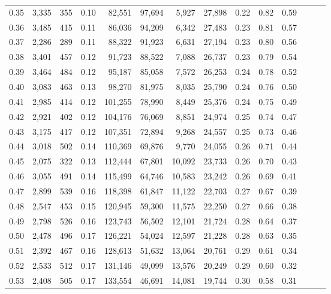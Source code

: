 \begin{tabular}{rrrrrrrrrrrrrr}
0.35 &  3,335 &  355 &  0.10 &   82,551 &   97,694 &   5,927 &  27,898 &  0.22 &  0.82 &      0.59 \\
0.36 &  3,485 &  415 &  0.11 &   86,036 &   94,209 &   6,342 &  27,483 &  0.23 &  0.81 &      0.57 \\
0.37 &  2,286 &  289 &  0.11 &   88,322 &   91,923 &   6,631 &  27,194 &  0.23 &  0.80 &      0.56 \\
0.38 &  3,401 &  457 &  0.12 &   91,723 &   88,522 &   7,088 &  26,737 &  0.23 &  0.79 &      0.54 \\
0.39 &  3,464 &  484 &  0.12 &   95,187 &   85,058 &   7,572 &  26,253 &  0.24 &  0.78 &      0.52 \\
0.40 &  3,083 &  463 &  0.13 &   98,270 &   81,975 &   8,035 &  25,790 &  0.24 &  0.76 &      0.50 \\
0.41 &  2,985 &  414 &  0.12 &  101,255 &   78,990 &   8,449 &  25,376 &  0.24 &  0.75 &      0.49 \\
0.42 &  2,921 &  402 &  0.12 &  104,176 &   76,069 &   8,851 &  24,974 &  0.25 &  0.74 &      0.47 \\
0.43 &  3,175 &  417 &  0.12 &  107,351 &   72,894 &   9,268 &  24,557 &  0.25 &  0.73 &      0.46 \\
0.44 &  3,018 &  502 &  0.14 &  110,369 &   69,876 &   9,770 &  24,055 &  0.26 &  0.71 &      0.44 \\
0.45 &  2,075 &  322 &  0.13 &  112,444 &   67,801 &  10,092 &  23,733 &  0.26 &  0.70 &      0.43 \\
0.46 &  3,055 &  491 &  0.14 &  115,499 &   64,746 &  10,583 &  23,242 &  0.26 &  0.69 &      0.41 \\
0.47 &  2,899 &  539 &  0.16 &  118,398 &   61,847 &  11,122 &  22,703 &  0.27 &  0.67 &      0.39 \\
0.48 &  2,547 &  453 &  0.15 &  120,945 &   59,300 &  11,575 &  22,250 &  0.27 &  0.66 &      0.38 \\
0.49 &  2,798 &  526 &  0.16 &  123,743 &   56,502 &  12,101 &  21,724 &  0.28 &  0.64 &      0.37 \\
0.50 &  2,478 &  496 &  0.17 &  126,221 &   54,024 &  12,597 &  21,228 &  0.28 &  0.63 &      0.35 \\
0.51 &  2,392 &  467 &  0.16 &  128,613 &   51,632 &  13,064 &  20,761 &  0.29 &  0.61 &      0.34 \\
0.52 &  2,533 &  512 &  0.17 &  131,146 &   49,099 &  13,576 &  20,249 &  0.29 &  0.60 &      0.32 \\
0.53 &  2,408 &  505 &  0.17 &  133,554 &   46,691 &  14,081 &  19,744 &  0.30 &  0.58 &      0.31 \\

\end{tabular}
